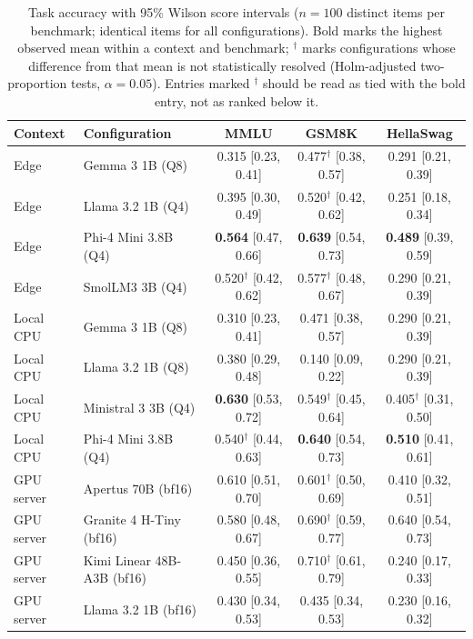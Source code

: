 \begin{table}[!t]
\revstart\centering
\caption{Task accuracy with 95\% Wilson score intervals ($n=100$ distinct items per benchmark; identical items for all configurations). Bold marks the highest observed mean within a context and benchmark; $^{\dagger}$ marks configurations whose difference from that mean is not statistically resolved (Holm-adjusted two-proportion tests, $\alpha=0.05$). Entries marked $^{\dagger}$ should be read as tied with the bold entry, not as ranked below it.}
\label{tab:accuracy-ci}
\footnotesize
\setlength{\tabcolsep}{3.5pt}
\begin{tabularx}{\textwidth}{@{}l L c c c@{}}
\toprule
\textbf{Context} & \textbf{Configuration} & \textbf{MMLU} & \textbf{GSM8K} & \textbf{HellaSwag} \\
\midrule
Edge & Gemma 3 1B (Q8) & 0.315 [0.23, 0.41] & 0.477$^{\dagger}$ [0.38, 0.57] & 0.291 [0.21, 0.39] \\
Edge & Llama 3.2 1B (Q4) & 0.395 [0.30, 0.49] & 0.520$^{\dagger}$ [0.42, 0.62] & 0.251 [0.18, 0.34] \\
Edge & Phi-4 Mini 3.8B (Q4) & \textbf{0.564} [0.47, 0.66] & \textbf{0.639} [0.54, 0.73] & \textbf{0.489} [0.39, 0.59] \\
Edge & SmolLM3 3B (Q4) & 0.520$^{\dagger}$ [0.42, 0.62] & 0.577$^{\dagger}$ [0.48, 0.67] & 0.290 [0.21, 0.39] \\
\midrule
Local CPU & Gemma 3 1B (Q8) & 0.310 [0.23, 0.41] & 0.471 [0.38, 0.57] & 0.290 [0.21, 0.39] \\
Local CPU & Llama 3.2 1B (Q8) & 0.380 [0.29, 0.48] & 0.140 [0.09, 0.22] & 0.290 [0.21, 0.39] \\
Local CPU & Ministral 3 3B (Q4) & \textbf{0.630} [0.53, 0.72] & 0.549$^{\dagger}$ [0.45, 0.64] & 0.405$^{\dagger}$ [0.31, 0.50] \\
Local CPU & Phi-4 Mini 3.8B (Q4) & 0.540$^{\dagger}$ [0.44, 0.63] & \textbf{0.640} [0.54, 0.73] & \textbf{0.510} [0.41, 0.61] \\
\midrule
GPU server & Apertus 70B (bf16) & 0.610 [0.51, 0.70] & 0.601$^{\dagger}$ [0.50, 0.69] & 0.410 [0.32, 0.51] \\
GPU server & Granite 4 H-Tiny (bf16) & 0.580 [0.48, 0.67] & 0.690$^{\dagger}$ [0.59, 0.77] & 0.640 [0.54, 0.73] \\
GPU server & Kimi Linear 48B-A3B (bf16) & 0.450 [0.36, 0.55] & 0.710$^{\dagger}$ [0.61, 0.79] & 0.240 [0.17, 0.33] \\
GPU server & Llama 3.2 1B (bf16) & 0.430 [0.34, 0.53] & 0.435 [0.34, 0.53] & 0.230 [0.16, 0.32] \\

\end{tabularx}
\end{table}
